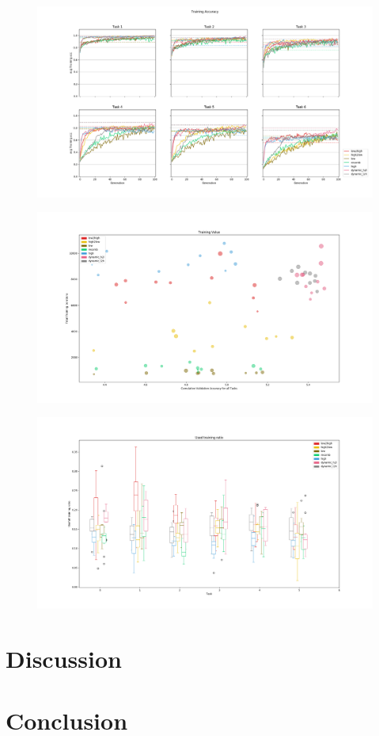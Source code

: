 \begin{figure}[h]
    \includegraphics[width=\textwidth]{Chapters/Experiments/search_algo/figures/Training_accuracy.png}
    \caption{}
    \label{fig:search.accuracy}
\end{figure}

\begin{figure}[h]
    \includegraphics[width=\textwidth]{Chapters/Experiments/search_algo/figures/Training_value.png}
    \caption{}
    \label{fig:search.training_value}
\end{figure}

\begin{figure}[h]
    \includegraphics[width=\textwidth]{Chapters/Experiments/search_algo/figures/Used_training_ratio.png}
    \caption{}
    \label{fig:search.usefull_training}
\end{figure}

\section{Discussion}
\section{Conclusion}